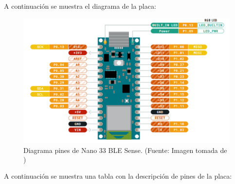 A continuación se muestra el diagrama de la placa:
\begin{figure}[H]
\centering
\includegraphics[scale=0.8]{./Figuras/Nota_teorica/PINES_NANO}
\caption{Diagrama pines de Nano 33 BLE Sense. (Fuente: Imagen tomada de \cite{arduino_nano33_ble_sense_datasheet})}
\label{fig:nano2}
\end{figure}
A continuación se muestra una tabla con la descripción de pines de la placa:
